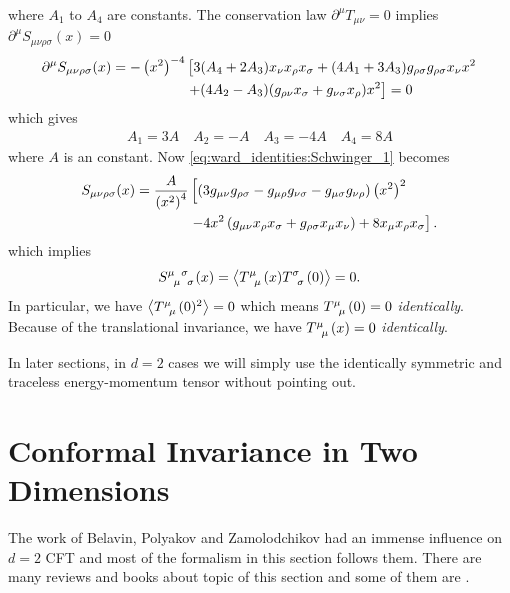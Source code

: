 \documentclass[10pt]{article}
\begin{document}
where $A_1$ to $A_4$ are constants.
The conservation law $\partial^\mu T_{\mu\nu}=0$ implies $\partial^\mu S_{\mu\nu\rho\sigma}(x)=0$
\begin{align}
    \partial^\mu S_{\mu\nu\rho\sigma}(x)=-\left(x^2\right)^{-4} & \left[3(A_4+2A_3)x_\nu x_\rho x_\sigma+(4A_1+3A_3)g_{\rho\sigma}g_{\rho\sigma}x_{\nu}x^2\right.\notag \\
                                                                & \left.+(4A_2-A_3)(g_{\rho\nu}x_\sigma+g_{\nu\sigma}x_\rho)x^2\right]=0
\end{align}
which gives
\begin{align}
    A_1=3A\quad A_2=-A\quad A_3=-4A\quad A_4=8A
\end{align}
where $A$ is an constant.
Now \cref{eq:ward_identities:Schwinger_1} becomes
\begin{align}
    S_{\mu\nu\rho\sigma}(x)=\frac{A}{\left(x^2\right)^4} & \left[(3g_{\mu\nu}g_{\rho\sigma}-g_{\mu\rho}g_{\nu\sigma}-g_{\mu\sigma}g_{\nu\rho})\left(x^2\right)^2\right.\notag \\
                                                         & \left.-4x^2\left(g_{\mu\nu}x_\rho x_\sigma+g_{\rho\sigma}x_\mu x_\nu\right)+8x_\mu x_\rho x_\sigma\right].
\end{align}
which implies
\begin{align}
    \tensor{S}{^\mu_\mu^\sigma_\sigma}(x)=\expval{\tensor{T}{^\mu_\mu}(x)\tensor{T}{^\sigma_\sigma}(0)}=0.
\end{align}
In particular, we have $\expval{\tensor{T}{^\mu_\mu}(0)^2}=0$ which means $\tensor{T}{^\mu_\mu}(0)=0$ \textit{identically}.
Because of the translational invariance, we have $\tensor{T}{^\mu_\mu}(x)=0$ \textit{identically}.
\begin{remark}
    In later sections, in $d=2$ cases we will simply use the identically symmetric and traceless energy-momentum tensor without pointing out.
\end{remark}

\clearpage
\section{Conformal Invariance in Two Dimensions}
The work of Belavin, Polyakov and Zamolodchikov \cite{Belavin:1984vu} had an immense influence on $d=2$ CFT and most of the formalism in this section follows them.
There are many reviews and books about topic of this section and some of them are \cite{Alvarez-Gaume:1989yow,itzykson_drouffe_1989,Nawata:2022lsw,Blumenhagen:2009zz,Schellekens:1996tg,Teschner,Gaberdiel:1999mc,Ribault:2016sla}.
\end{document}
